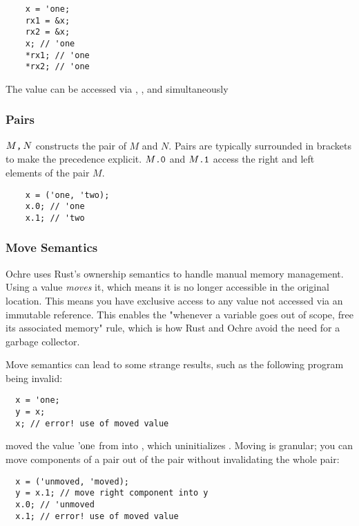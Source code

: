 \documentclass[12pt,twoside]{report}
\begin{document}
\begin{listing}[H]
  \begin{verbatim}
    x = 'one;
    rx1 = &x;
    rx2 = &x;
    x; // 'one
    *rx1; // 'one
    *rx2; // 'one
  \end{verbatim}
  \caption{The value  can be accessed via , , and  simultaneously}
  \label{lst:immref}
\end{listing}

\subsubsection{Pairs}
$M \text{\texttt{,}} \, N$ constructs the pair of $M$ and $N$. Pairs are typically surrounded in brackets to make the precedence explicit. $M\text{\texttt{.0}}$ and $M\text{\texttt{.1}}$ access the right and left elements of the pair $M$.

  \begin{verbatim}
    x = ('one, 'two);
    x.0; // 'one
    x.1; // 'two
  \end{verbatim}

\subsubsection{Move Semantics}
Ochre uses Rust's ownership semantics to handle manual memory management. Using a value \textit{moves} it, which means it is no longer accessible in the original location. This means you have exclusive access to any value not accessed via an immutable reference. This enables the "whenever a variable goes out of scope, free its associated memory" rule, which is how Rust and Ochre avoid the need for a garbage collector.

Move semantics can lead to some strange results, such as the following program being invalid:

\begin{verbatim}
  x = 'one;
  y = x;
  x; // error! use of moved value
\end{verbatim}

 moved the value $\text{'one}$ from  into , which uninitializes . Moving is granular; you can move components of a pair out of the pair without invalidating the whole pair:

\begin{verbatim}
  x = ('unmoved, 'moved);
  y = x.1; // move right component into y
  x.0; // 'unmoved
  x.1; // error! use of moved value
\end{verbatim}
\end{document}
